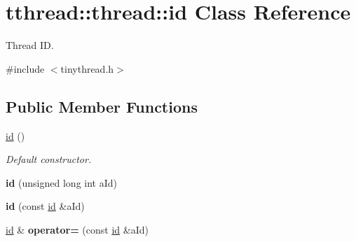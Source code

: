 \hypertarget{classtthread_1_1thread_1_1id}{}\section{tthread\+:\+:thread\+:\+:id Class Reference}
\label{classtthread_1_1thread_1_1id}


Thread ID.  




{\ttfamily \#include $<$tinythread.\+h$>$}

\subsection*{Public Member Functions}
\begin{DoxyCompactItemize}
\item 
\hyperlink{classtthread_1_1thread_1_1id_a2f4520d8222d77c0a2c36602e0bcb6d1}{id} ()
\begin{DoxyCompactList}\small\item\em Default constructor. \end{DoxyCompactList}\item 
{\bfseries id} (unsigned long int a\+Id)\hypertarget{classtthread_1_1thread_1_1id_a7eb182ab9a6336591e1e3c4a10687054}{}\label{classtthread_1_1thread_1_1id_a7eb182ab9a6336591e1e3c4a10687054}

\item 
{\bfseries id} (const \hyperlink{classtthread_1_1thread_1_1id}{id} \&a\+Id)\hypertarget{classtthread_1_1thread_1_1id_a5bc6cef3674f2edd96812cb85686b6af}{}\label{classtthread_1_1thread_1_1id_a5bc6cef3674f2edd96812cb85686b6af}

\item 
\hyperlink{classtthread_1_1thread_1_1id}{id} \& {\bfseries operator=} (const \hyperlink{classtthread_1_1thread_1_1id}{id} \&a\+Id)\hypertarget{classtthread_1_1thread_1_1id_a2a4ed2ddef655f1599ec056b15f4ffaf}{}\label{classtthread_1_1thread_1_1id_a2a4ed2ddef655f1599ec056b15f4ffaf}

\end{DoxyCompactItemize}
